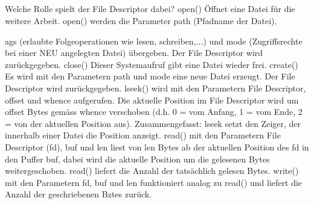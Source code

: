 \subsection{}
\begin{answer}
Welche Rolle spielt der File Descriptor dabei?
open()
Öffnet eine Datei für die weitere Arbeit. open() werden die Parameter path (Pfadname der Datei),

ags (erlaubte Folgeoperationen wie lesen, schreiben,...) und mode (Zugriffsrechte bei einer NEU
angelegten Datei) übergeben. Der File Descriptor wird zurückgegeben.
close()
Dieser Systemaufruf gibt eine Datei wieder frei.
create()
Es wird mit den Parametern path und mode eine neue Datei erzeugt. Der File Descriptor wird
zurückgegeben.
lseek()
wird mit den Parametern File Descriptor, offset und whence aufgerufen. Die aktuelle Position im
File Descriptor wird um offset Bytes gemäss whence verschoben (d.h. 0 = vom Anfang, 1 = vom
Ende, 2 = von der aktuellen Position aus).
Zusammengefasst: lseek setzt den Zeiger, der innerhalb einer Datei die Position anzeigt.
read()
mit den Parametern File Descriptor (fd), buf und len liest von len Bytes ab der aktuellen Position
des fd in den Puffer buf, dabei wird die aktuelle Position um die gelesenen Bytes weitergeschoben.
read() liefert die Anzahl der tatsächlich gelesen Bytes.
write()
mit den Parametern fd, buf und len funktioniert analog zu read() und liefert die Anzahl der geschriebenen
Bztes zurück.
\end{answer}

